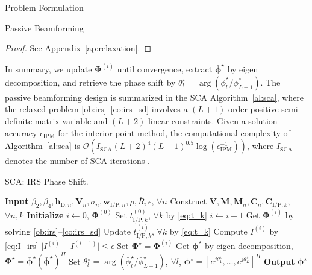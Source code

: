 \documentclass[journal]{IEEEtran}
\begin{document}
\begin{section}{Problem Formulation}
\begin{subsection}{Passive Beamforming}
			\begin{proof}\label{pf:relaxation}
				See Appendix~\ref{ap:relaxation}.
			\end{proof}

			In summary, we update $\boldsymbol{\Phi}^{(i)}$ until convergence, extract $\bar{\boldsymbol{\phi}}^\star$ by eigen decomposition, and retrieve the phase shift by $\theta_l^{\star}=\arg(\bar{\phi}_l^\star/\bar{\phi}_{L+1}^\star)$. The passive beamforming design is summarized in the SCA Algorithm~\ref{al:sca}, where the relaxed problem \eqref{ob:irs}--\eqref{co:irs_sd} involves a $(L+1)$-order positive semi-definite matrix variable and $(L+2)$ linear constraints. Given a solution accuracy $\epsilon_{\mathrm{IPM}}$ for the interior-point method, the computational complexity of Algorithm~\ref{al:sca} is $\mathcal{O}\left(I_{\mathrm{SCA}}(L+2)^4 (L+1)^{0.5} \log(\epsilon_{\mathrm{IPM}}^{-1})\right)$, where $I_{\mathrm{SCA}}$ denotes the number of SCA iterations \cite{Luo2010}.

			\begin{algorithm}[!t]
				\caption{SCA: IRS Phase Shift.}
				\label{al:sca}
				\begin{algorithmic}[1]
					\State \textbf{Input} $\beta_2,\beta_4,\boldsymbol{h}_{\mathrm{D},n},\boldsymbol{V}_{n},\sigma_n,\boldsymbol{w}_{\mathrm{I/P},n},\rho,\bar{R},\epsilon$, $\forall n$
					\State Construct $\boldsymbol{V},\boldsymbol{M},\boldsymbol{M}_n,\boldsymbol{C}_{n},\boldsymbol{C}_{\mathrm{I/P},k}$, $\forall n,k$
					\State \textbf{Initialize} $i \gets 0$, $\boldsymbol{\Phi}^{(0)}$
					\State Set $t_{\mathrm{I/P},k}^{(0)}$, $\forall k$ by \eqref{eq:t_k}
					\Repeat
						\State $i \gets i + 1$
						\State Get $\boldsymbol{\Phi}^{(i)}$ by solving \eqref{ob:irs}--\eqref{co:irs_sd}
						\State Update $t_{\mathrm{I/P},k}^{(i)}$, $\forall k$ by \eqref{eq:t_k}
						\State Compute $I^{(i)}$ by \eqref{eq:I_irs}
					\Until $\lvert I^{(i)}-I^{(i-1)} \rvert \le \epsilon$
					\State Set $\boldsymbol{\Phi}^{\star}=\boldsymbol{\Phi}^{(i)}$
					\State Get $\bar{\boldsymbol{\phi}}^\star$ by eigen decomposition, $\boldsymbol{\Phi}^{\star}=\bar{\boldsymbol{\phi}}^\star(\bar{\boldsymbol{\phi}}^\star)^H$
					\State Set $\theta_l^\star=\arg(\bar{\phi}_l^\star/\bar{\phi}_{L+1}^\star)$, $\forall l$, $\boldsymbol{\phi}^{\star}=[e^{j\theta_1^\star},\dots,e^{j\theta_L^\star}]^H$
					\State \textbf{Output} $\boldsymbol{\phi}^{\star}$
				\end{algorithmic}
			\end{algorithm}


\end{subsection}
\end{section}
\end{document}
